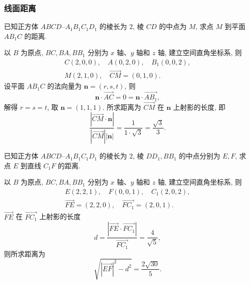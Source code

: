 \subsubsection{线面距离}
\begin{example}
    已知正方体 $ABCD\text{--}A_1B_1C_1D_1$ 的棱长为 $2$, 棱 $CD$ 的中点为 $M$, 求点 $M$ 到平面 $AB_1C$ 的距离.
\end{example}
\beginsolution
    以 $B$ 为原点, $BC, BA, BB_1$ 分别为 $x$ 轴、$y$ 轴和 $z$ 轴, 建立空间直角坐标系, 则
    \[\begin{gathered}
        C(2,0,0),\quad A(0,2,0),\quad B_1(0,0,2),\\
        M(2,1,0),\quad \overrightarrow{CM}= (0,1,0).
    \end{gathered}\]
    设平面 $AB_1C$ 的法向量为 $\bm{n}= (r,s,t)$, 则
    \[\bm{n}\cdot \overrightarrow{AC}= 0
    = \bm{n}\cdot \overrightarrow{AB_1},\]
    解得 $r=s=t$, 取 $\bm{n}= (1,1,1)$. 所求距离为 $\overrightarrow{CM}$ 在 $\bm{n}$ 上射影的长度, 即
    \[\frac{|\overrightarrow{CM}\cdot \bm{n}|}{
        |\overrightarrow{CM}| |\bm{n}|}
    = \frac1{1\cdot \sqrt3}= \frac{\sqrt{3}}{3}.\]
\endsolution

\lianxi
\begin{exercise}[s]
    已知正方体 $ABCD\text{--}A_1B_1C_1D_1$ 的棱长为 $2$, 棱 $DD_1, BB_1$ 的中点分别为 $E, F$, 求点 $E$ 到直线 $C_1F$ 的距离.
\end{exercise}
\beginsolution
    以 $B$ 为原点, $BC, BA, BB_1$ 分别为 $x$ 轴、$y$ 轴和 $z$ 轴, 建立空间直角坐标系, 则
    \[\begin{gathered}
        E(2,2,1),\quad F(0,0,1),\quad C_1(2,0,2),\\
        \overrightarrow{FE}= (2,2,0),\quad 
        \overrightarrow{FC_1}= (2,0,1).
    \end{gathered}\]
    $\overrightarrow{FE}$ 在 $\overrightarrow{FC_1}$ 上射影的长度
    \[d= \frac{|\overrightarrow{FE}\cdot \overrightarrow{FC_1}|}{
        \overrightarrow{FC_1}}
    = \frac4{\sqrt5},\]
    则所求距离为
    \[\sqrt{|\overrightarrow{EF}|^2- d^2}= \frac{2\sqrt{30}}{5}.\]
\endsolution

      
      
